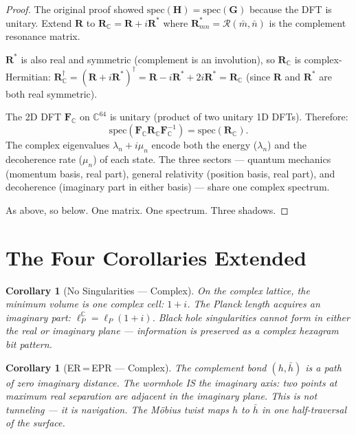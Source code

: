 \documentclass[12pt,a4paper]{article}
\newtheorem{corollary}[theorem]{Corollary}
\theoremstyle{definition}
\theoremstyle{remark}
\newcommand{\res}{\mathcal{R}}
\newcommand{\CC}{\mathbb{C}}
\begin{document}
\begin{proof}
The original proof showed $\mathrm{spec}(\mathbf{H}) = \mathrm{spec}(\mathbf{G})$
because the DFT is unitary. Extend $\mathbf{R}$ to $\mathbf{R}_\CC =
\mathbf{R} + i\mathbf{R}^*$ where $\mathbf{R}^*_{mn} = \res(\bar{m}, \bar{n})$
is the complement resonance matrix.

$\mathbf{R}^*$ is also real and symmetric (complement is an involution), so
$\mathbf{R}_\CC$ is complex-Hermitian:
$\mathbf{R}_\CC^\dagger = (\mathbf{R} + i\mathbf{R}^*)^\dagger
= \mathbf{R} - i\mathbf{R}^* + 2i\mathbf{R}^* = \mathbf{R}_\CC$
(since $\mathbf{R}$ and $\mathbf{R}^*$ are both real symmetric).

The 2D DFT $\mathbf{F}_\CC$ on $\CC^{64}$ is unitary (product of two unitary
1D DFTs). Therefore:
\begin{equation}
  \mathrm{spec}(\mathbf{F}_\CC \mathbf{R}_\CC \mathbf{F}_\CC^{-1})
  = \mathrm{spec}(\mathbf{R}_\CC).
\end{equation}
The complex eigenvalues $\lambda_n + i\mu_n$ encode both the energy ($\lambda_n$)
and the decoherence rate ($\mu_n$) of each state. The three sectors ---
quantum mechanics (momentum basis, real part), general relativity (position
basis, real part), and decoherence (imaginary part in either basis) --- share
one complex spectrum.

As above, so below. One matrix. One spectrum. Three shadows.
\end{proof}

\section{The Four Corollaries Extended}\label{sec:corollaries-ext}

\begin{corollary}[No Singularities --- Complex]\label{cor:sing-complex}
On the complex lattice, the minimum volume is one complex cell: $1 + i$.
The Planck length acquires an imaginary part: $\ell_P^\CC = \ell_P(1+i)$.
Black hole singularities cannot form in either the real or imaginary
plane --- information is preserved as a complex hexagram bit pattern.
\end{corollary}

\begin{corollary}[ER\,=\,EPR --- Complex]\label{cor:erepr-complex}
The complement bond $(h, \bar{h})$ is a path of zero imaginary distance.
The wormhole IS the imaginary axis: two points at maximum real separation
are adjacent in the imaginary plane. This is not tunneling --- it is
navigation. The Möbius twist maps $h$ to $\bar{h}$ in one half-traversal
of the surface.
\end{corollary}
\end{document}
